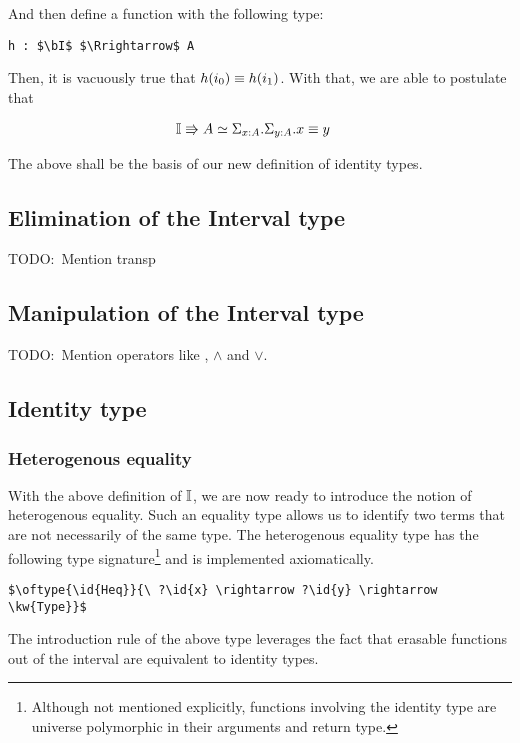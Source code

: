 \documentclass[11pt]{article}
\newcommand\kw[1] {\textsf{#1}}
\newcommand\id[1] {\textsl{#1}}
\begin{document}
And then define a function with the following type:

\begin{lstlisting}
h : $\bI$ $\Rrightarrow$ A
\end{lstlisting}

Then, it is vacuously true that $\eqtype{h(i_0)}{h(i_1)}$. With that, we are able to postulate that 

\begin{align*}
  & \bI \Rrightarrow A \simeq \Sigma_{\oftype{x}{A}} . \Sigma_{\oftype{y}{A}} . \eqtype{x}{y}
\end{align*}

The above shall be the basis of our new definition of identity types.

\subsection{Elimination of the Interval type}
TODO:\ Mention transp

\subsection{Manipulation of the Interval type}
TODO:\ Mention operators like $\!$, $\wedge$ and $\vee$.

\subsection{Identity type}

\subsubsection{Heterogenous equality}
With the above definition of $\mathbb{I}$, we are now ready to introduce the notion of heterogenous equality. Such an equality type allows us to identify two terms that are not necessarily of the same type. The heterogenous equality type has the following type signature\footnote{Although not mentioned explicitly, functions involving the identity type are universe polymorphic in their arguments and return type.} and is implemented axiomatically.

\begin{lstlisting}
$\oftype{\id{Heq}}{\ ?\id{x} \rightarrow ?\id{y} \rightarrow \kw{Type}}$
\end{lstlisting}

The introduction rule of the above type leverages the fact that erasable functions out of the interval are equivalent to identity types.
\end{document}
